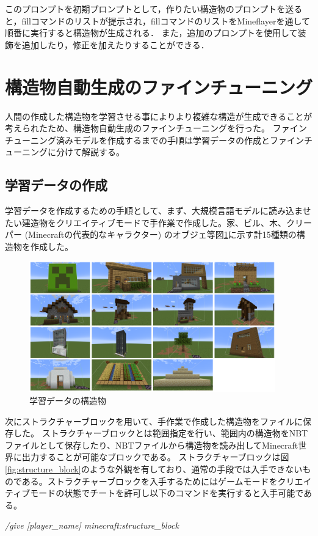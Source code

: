 このプロンプトを初期プロンプトとして，作りたい構造物のプロンプトを送ると，fillコマンドのリストが提示され，fillコマンドのリストをMineflayerを通して順番に実行すると構造物が生成される．
また，追加のプロンプトを使用して装飾を追加したり，修正を加えたりすることができる．

\section{構造物自動生成のファインチューニング}
人間の作成した構造物を学習させる事によりより複雑な構造が生成できることが考えられたため、構造物自動生成のファインチューニングを行った。
ファインチューニング済みモデルを作成するまでの手順は学習データの作成とファインチューニングに分けて解説する。

\subsection{学習データの作成}
学習データを作成するための手順として、まず、大規模言語モデルに読み込ませたい建造物をクリエイティブモードで手作業で作成した。家、ビル、木、クリーパー (Minecraftの代表的なキャラクター) のオブジェ等図\ref{fig:train_structure}に示す計15種類の構造物を作成した。

\begin{figure}[H]
    \centering
    \includegraphics[width=0.95\textwidth]{fig/train_data.PNG}
    \caption{学習データの構造物}
    \label{fig:train_structure}
\end{figure}

次にストラクチャーブロックを用いて、手作業で作成した構造物をファイルに保存した。
ストラクチャーブロックとは範囲指定を行い、範囲内の構造物をNBTファイルとして保存したり、NBTファイルから構造物を読み出してMinecraft世界に出力することが可能なブロックである。
ストラクチャーブロックは図\ref{fig:structure_block}のような外観を有しており、通常の手段では入手できないものである。ストラクチャーブロックを入手するためにはゲームモードをクリエイティブモードの状態でチートを許可し以下のコマンドを実行すると入手可能である。
\begin{center}
    \textit{/give [player\_name] minecraft:structure\_block}
\end{center}

